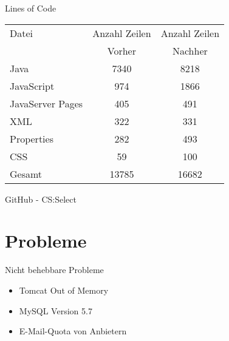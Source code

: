 \documentclass[xcolor=dvipsnames]{beamer}
\begin{document}
\begin{frame}{Lines of Code}
    \begin{table}[t]
  \begin{center}
    \begin{tabular}{ | l | c | c | }
      \hline
      Datei & Anzahl Zeilen & Anzahl Zeilen \\
        & Vorher & Nachher \\ \hline
      Java & 7340 & 8218 \\
      JavaScript & 974 & 1866 \\
      JavaServer Pages & 405 & 491 \\
      XML & 322 & 331 \\
      Properties & 282 & 493 \\
      CSS & 59 & 100 \\ \Xhline{0.8pt}
      Gesamt & 13785 & 16682 \\ \hline
    \end{tabular}
  \end{center}
\end{table}
\end{frame}


\begin{frame}{GitHub - CS:Select}
    \begin{itemize}
        \vspace{10pt}
    \end{itemize}
\end{frame}

\section{Probleme}
\begin{frame}{Nicht behebbare Probleme}
\begin{itemize}
    \item Tomcat Out of Memory
    \item MySQL Version 5.7
    \item E-Mail-Quota von Anbietern
\end{itemize}
\end{frame}
\end{document}

